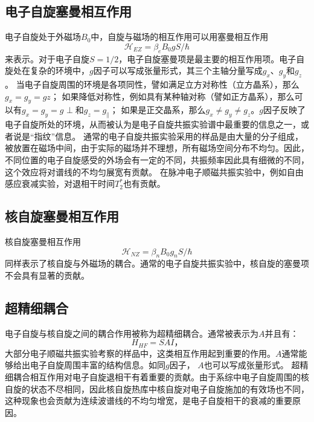     \subsection{电子自旋塞曼相互作用}
    电子自旋处于外磁场$B_0$中，自旋与磁场的相互作用可以用塞曼相互作用
        \begin{equation}
        \label{E-Zeeman}
        \mathcal{H}_{EZ} = \beta_e B_0 g S/\hbar
        \end{equation}
    来表示。对于电子自旋$S = 1/2$，电子自旋塞曼项是最主要的相互作用项。电子自旋处在复杂的环境中，$g$因子可以写成张量形式，其三个主轴分量写成$g_x$、$g_y$和$g_z$。
    当电子自旋周围的环境是各项同性，譬如满足立方对称性（立方晶系），那么$g_x=g_y=gz$；
    如果降低对称性，例如具有某种轴对称（譬如正方晶系），那么可以有$g_x=g_y=g_{}\perp$和$g_z=g_{\parallel}$；
    如果是正交晶系，那么$g_x\neq g_y\neq g_z$。$g$因子反映了电子自旋所处的环境，从而被认为是电子自旋共振实验谱中最重要的信息之一，或者说是“指纹”信息。
    通常的电子自旋共振实验采用的样品是由大量的分子组成，被放置在磁场中间，由于实际的磁场并不理想，所有磁场空间分布不均匀。因此，不同位置的电子自旋感受的外场会有一定的不同，共振频率因此具有细微的不同，这个效应将对谱线的不均匀展宽有贡献。
    在脉冲电子顺磁共振实验中，例如自由感应衰减实验，对退相干时间$T_2^*$也有贡献。
    \subsection{核自旋塞曼相互作用}
    核自旋塞曼相互作用
        \begin{equation}
        \label{N-Zeeman}
        \mathcal{H}_{NZ} = \beta_n B_0 g_n S/\hbar
        \end{equation}
    同样表示了核自旋与外磁场的耦合。通常的电子自旋共振实验中，核自旋的塞曼项不会具有显著的贡献。


    \subsection{超精细耦合}
    电子自旋与核自旋之间的耦合作用被称为超精细耦合。通常被表示为$A$并且有：
        \begin{equation}
        \label{hyperfine interaction}
        H_{HF} =  S A I，
        \end{equation}
    大部分电子顺磁共振实验考察的样品中，这类相互作用起到重要的作用。$A$通常能够给出电子自旋周围丰富的结构信息。如同$g$因子， $A$也可以写成张量形式。
    超精细耦合相互作用对电子自旋退相干有着重要的贡献。由于系综中电子自旋周围的核自旋的状态不尽相同，因此核自旋热库中核自旋对电子自旋施加的有效场也不同，这种现象也会贡献为连续波谱线的不均匀增宽，是电子自旋相干的衰减的重要原因。

